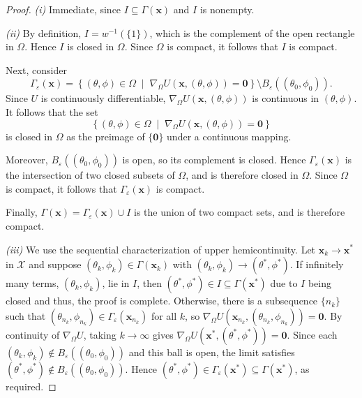 \documentclass[11pt,letterpaper]{article}
\theoremstyle{definition}
\theoremstyle{plain}
\begin{document}
\begin{proof}
\emph{(i)} Immediate, since $I \subseteq \Gamma(\mathbf{x})$ and $I$ is nonempty.

\smallskip\noindent\emph{(ii)} 
By definition, $I = w^{-1}(\{1\})$, which is the  complement of the open rectangle in $\Omega$. Hence $I$ is closed in $\Omega$. Since $\Omega$ is compact, it follows that $I$ is compact.

\medskip

Next, consider
\[
\Gamma_\varepsilon(\mathbf{x}) 
= \left\{ (\theta,\phi)\in \Omega \;\middle|\; \nabla_\Omega U(\mathbf{x},(\theta,\phi)) = \mathbf{0} \right\}
\setminus B_\varepsilon((\theta_0,\phi_0)).
\]
Since $U$ is continuously differentiable, $\nabla_\Omega U(\mathbf{x},(\theta,\phi))$ is continuous in $(\theta,\phi)$. It follows that the set
\[
\left\{ (\theta,\phi)\in \Omega \;\middle|\; \nabla_\Omega U(\mathbf{x},(\theta,\phi)) = \mathbf{0} \right\}
\]
is closed in $\Omega$ as the preimage of $\{\mathbf{0}\}$ under a continuous mapping. 

Moreover, $B_\varepsilon((\theta_0,\phi_0))$ is open, so its complement is closed. Hence $\Gamma_\varepsilon(\mathbf{x})$ is the intersection of two closed subsets of $\Omega$, and is therefore closed in $\Omega$. Since $\Omega$ is compact, it follows that $\Gamma_\varepsilon(\mathbf{x})$ is compact.

\medskip

Finally, $\Gamma(\mathbf{x}) = \Gamma_\varepsilon(\mathbf{x}) \cup I$ is the union of two compact sets, and is therefore compact.

\smallskip\noindent\emph{(iii)} We use the sequential characterization of upper hemicontinuity. Let $\mathbf{x}_k \to \mathbf{x}^*$ in $\mathcal{X}$ and suppose $(\theta_k, \phi_k) \in \Gamma(\mathbf{x}_k)$ with $(\theta_k, \phi_k) \to (\theta^*, \phi^*)$. If infinitely many terms, $(\theta_k, \phi_k)$, lie in $I$, then $(\theta^*, \phi^*) \in I \subseteq \Gamma(\mathbf{x}^*)$ due to $I$ being closed and thus, the proof is complete.
Otherwise, there is a subsequence $\{n_k\}$ such that $(\theta_{n_k}, \phi_{n_k}) \in \Gamma_\varepsilon(\mathbf{x}_{n_k})$ for all $k$, so $\nabla_\Omega U(\mathbf{x}_{n_k}, (\theta_{n_k}, \phi_{n_k})) = \mathbf{0}$. By continuity of $\nabla_\Omega U$, taking $k \to \infty$ gives $\nabla_\Omega U(\mathbf{x}^*, (\theta^*, \phi^*)) = \mathbf{0}$. Since each $(\theta_k, \phi_k) \notin B_\varepsilon((\theta_0, \phi_0))$ and this ball is open, the limit satisfies $(\theta^*, \phi^*) \notin B_\varepsilon((\theta_0, \phi_0))$. Hence $(\theta^*, \phi^*) \in \Gamma_\varepsilon(\mathbf{x}^*) \subseteq \Gamma(\mathbf{x}^*)$, as required.


\end{proof}
\end{document}
